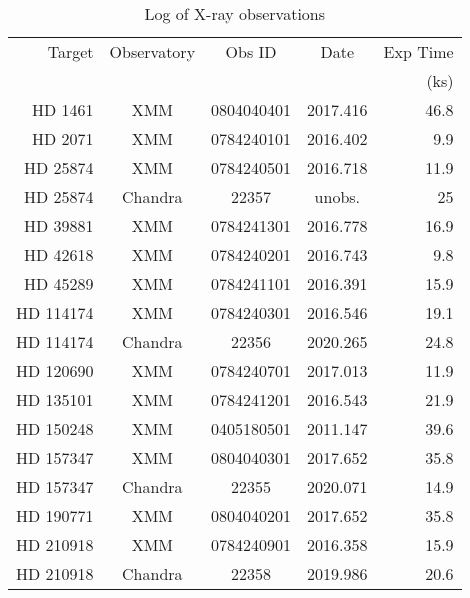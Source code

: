 
\begin{table}
\caption{Log of X-ray observations\label{tab:obs}}

  \centering
  \begin{tabular}{rcccr}
    \hline
    \hline
    Target & Observatory & Obs ID & Date & Exp Time \\
           &              &       &      & (ks) \\ 
    \hline       
HD 1461 & XMM & 0804040401 & 2017.416 &  46.8 \\ 
HD 2071 & XMM & 0784240101 & 2016.402 &   9.9 \\ 
HD 25874 & XMM & 0784240501 & 2016.718 &  11.9 \\
HD 25874 & Chandra & 22357 & unobs. & 25\\
HD 39881 & XMM & 0784241301 & 2016.778 &  16.9 \\ 
HD 42618 & XMM & 0784240201 & 2016.743 &   9.8 \\ 
HD 45289 & XMM & 0784241101 & 2016.391 &  15.9 \\ 
HD 114174 & XMM & 0784240301 & 2016.546 &  19.1 \\
HD 114174 & Chandra & 22356 & 2020.265 & 24.8 \\
HD 120690 & XMM & 0784240701 & 2017.013 &  11.9 \\ 
HD 135101 & XMM & 0784241201 & 2016.543 &  21.9 \\ 
HD 150248 & XMM & 0405180501 & 2011.147 &  39.6 \\ 
HD 157347 & XMM & 0804040301 & 2017.652 &  35.8 \\ 
HD 157347 & Chandra & 22355 & 2020.071 & 14.9 \\
HD 190771 & XMM & 0804040201 & 2017.652 &  35.8 \\ 
HD 210918 & XMM & 0784240901 & 2016.358 &  15.9 \\ 
HD 210918 & Chandra & 22358 & 2019.986 & 20.6\\
    \hline
  \end{tabular}
\end{table}
